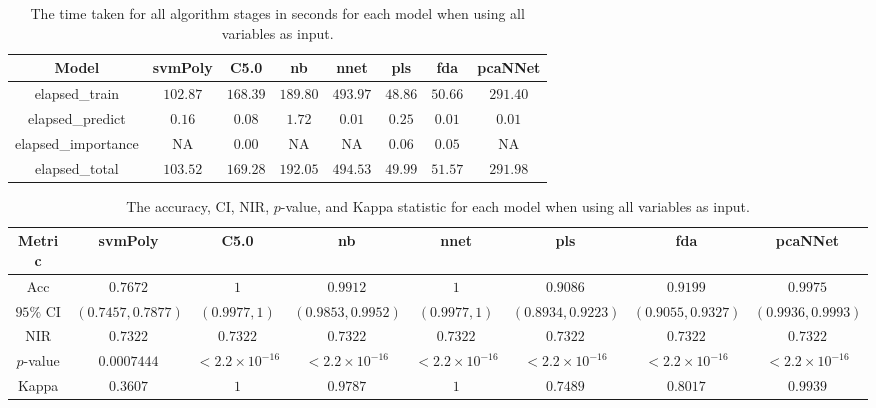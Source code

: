 \begin{table}[!ht]
	\centering
	\begin{tabular}{|c|c|c|c|c|c|c|c|}
		\hline
		Model & svmPoly & C5.0 & nb & nnet & pls & fda & pcaNNet \\ \hline
		elapsed_train & $102.87$ & $168.39$ & $189.80$ & $493.97$ & $48.86$ & $50.66$ & $291.40$ \\ \hline
		elapsed_predict & $0.16$ & $0.08$ & $1.72$ & $0.01$ & $0.25$ & $0.01$ & $0.01$ \\ \hline
		elapsed_importance & NA & $0.00$ & NA & NA & $0.06$ & $0.05$ & NA \\ \hline
		elapsed_total & $103.52$ & $169.28$ & $192.05$ & $494.53$ & $49.99$ & $51.57$ & $291.98$ \\ \hline
	\end{tabular}
	\caption{The time taken for all algorithm stages in seconds for each model when using all variables as input.}
	\label{tab:time:reverse:all}
\end{table}

\begin{table}[!ht]
	\centering
	\begin{tabular}{|c|c|c|c|c|c|c|c|}
		\hline
		Metric & svmPoly & C5.0 & nb & nnet & pls & fda & pcaNNet \\ \hline
		Acc & $0.7672$ & $1$ & $0.9912$ & $1$ & $0.9086$ & $0.9199$ & $0.9975$ \\ \hline
		$95\%$ CI & $(0.7457, 0.7877)$ & $(0.9977, 1)$ & $(0.9853, 0.9952)$ & $(0.9977, 1)$ & $(0.8934, 0.9223)$ & $(0.9055, 0.9327)$ & $(0.9936, 0.9993)$ \\ \hline
		NIR & $0.7322$ & $0.7322$ & $0.7322$ & $0.7322$ & $0.7322$ & $0.7322$ & $0.7322$ \\ \hline
		$p$-value & $0.0007444$ & $< 2.2 \times {10}^{-16}$ & $< 2.2 \times {10}^{-16}$ & $< 2.2 \times {10}^{-16}$ & $< 2.2 \times {10}^{-16}$ & $< 2.2 \times {10}^{-16}$ & $< 2.2 \times {10}^{-16}$ \\ \hline
		Kappa & $0.3607$ & $1$ & $0.9787$ & $1$ & $0.7489$ & $0.8017$ & $0.9939$ \\ \hline
	\end{tabular}
	\caption{The accuracy, CI, NIR, $p$-value, and Kappa statistic for each model when using all variables as input.}
	\label{tab:stats:all}
\end{table}

